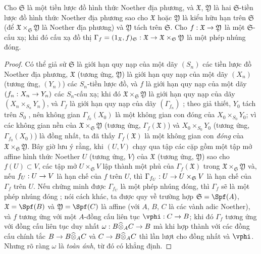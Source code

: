 \documentclass[oneside]{amsart}
\makeatletter
\newcommand{\ega@arrow}[2]{\mathchoice{#1}{#2}{#2}{#2}}
\renewcommand{\to}{\ega@arrow{\longrightarrow}{\rightarrow}}
\let\EGAOriginalLabel\label
\renewcommand{\label}[1]{\phantomsection\EGAOriginalLabel{#1}}
\makeatother
\begin{document}
\begin{proposition}[10.15.4]
\label{I.10.15.4}
Cho $\mathfrak{S}$ là một tiền lược đồ hình thức Noether địa phương, và $\mathfrak{X}$, $\mathfrak{Y}$ là hai $\mathfrak{S}$-tiền lược đồ hình thức Noether địa phương sao cho $\mathfrak{X}$ hoặc $\mathfrak{Y}$ là kiểu hữu hạn trên $\mathfrak{S}$ (để $\mathfrak{X}\times_\mathfrak{S}\mathfrak{Y}$ là Noether địa phương) và $\mathfrak{Y}$ tách trên $\mathfrak{S}$.
Cho $f:\mathfrak{X}\to\mathfrak{Y}$ là một $\mathfrak{S}$-cấu xạ; khi đó cấu xạ đồ thị $\Gamma_f=(1_\mathfrak{X},f)_\mathfrak{S}:\mathfrak{X}\to\mathfrak{X}\times_\mathfrak{S}\mathfrak{Y}$ là một phép nhúng đóng.
\end{proposition}

\begin{proof}
Có thể giả sử $\mathfrak{S}$ là giới hạn quy nạp của một dãy $(S_n)$ các tiền lược đồ Noether địa phương, $\mathfrak{X}$ (tương ứng, $\mathfrak{Y}$) là giới hạn quy nạp của một dãy $(X_n)$ (tương ứng, $(Y_n)$) các $S_n$-tiền lược đồ, và $f$ là giới hạn quy nạp của một dãy $(f_n:X_n\to Y_n)$ các $S_n$-cấu xạ;
khi đó $\mathfrak{X}\times_\mathfrak{S}\mathfrak{Y}$ là giới hạn quy nạp của dãy $(X_n\times_{S_n}Y_n)$, và $\Gamma_f$ là giới hạn quy nạp của dãy $(\Gamma_{f_n})$ ;
theo giả thiết, $Y_0$ tách trên $S_0$ , nên không gian $\Gamma_{f_0}(X_0)$ là một không gian con đóng của $X_0\times_{S_0}Y_0$;
vì các không gian nền của $\mathfrak{X}\times_\mathfrak{S}\mathfrak{Y}$ (tương ứng, $\Gamma_f(\mathfrak{X})$) và $X_0\times_{S_0}Y_0$ (tương ứng, $\Gamma_{f_0}(X_0)$) là đồng nhất, ta đã thấy $\Gamma_f(\mathfrak{X})$ là một không gian con \emph{đóng} của $\mathfrak{X}\times_\mathfrak{S}\mathfrak{Y}$.
Bây giờ lưu ý rằng, khi $(U,V)$ chạy qua tập các cặp gồm một tập mở affine hình thức Noether $U$ (tương ứng, $V$) của $\mathfrak{X}$ (tương ứng, $\mathfrak{Y}$) sao cho $f(U)\subset V$, các tập mở $U\times_\mathfrak{S} V$ lập thành một phủ của $\Gamma_f(\mathfrak{X})$ trong $\mathfrak{X}\times_\mathfrak{S}\mathfrak{Y}$ và, nếu $f_U:U\to V$ là hạn chế của $f$ trên $U$, thì $\Gamma_{f_U}:U\to U\times_\mathfrak{S}V$ là hạn chế của $\Gamma_f$ trên $U$.
Nếu chứng minh được $\Gamma_{f_U}$ là một phép nhúng đóng, thì $\Gamma_f$ sẽ là một phép nhúng đóng ; nói cách khác, ta được quy về trường hợp $\mathfrak{S}=\Spf(A)$, $\mathfrak{X}=\Spf(B)$ và $\mathfrak{Y}=\Spf(C)$ là affine (với $A$, $B$, $C$ là các vành adic Noether), và $f$ tương ứng với một $A$-đồng cấu liên tục $\vphi:C\to B$;
khi đó $\Gamma_f$ tương ứng với đồng cấu liên tục duy nhất $\omega: B\widehat{\otimes}_A C\to B$ mà khi hợp thành với các đồng cấu chính tắc $B\to B\widehat{\otimes}_A C$ và $C\to B\widehat{\otimes}_A C$ thì lần lượt cho đồng nhất và $\vphi$.
Nhưng rõ ràng $\omega$ là \emph{toàn ánh}, từ đó có khẳng định.
\end{proof}
\end{document}
